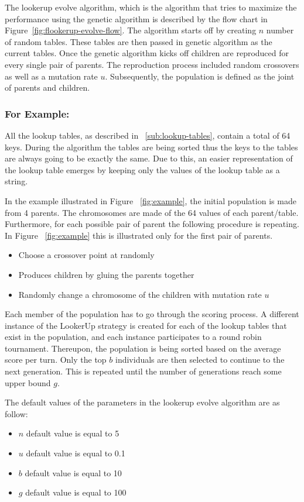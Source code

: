 The lookerup evolve algorithm, which is the algorithm that tries to maximize
the performance using the genetic algorithm is described by the flow chart in
Figure~\ref{fig:flookerup-evolve-flow}. The algorithm starts off by creating
\(n\) number of random tables. These tables are then passed in genetic algorithm
as the current tables.
Once the genetic algorithm kicks off children are reproduced for every single pair
of parents. The reproduction process included random crossovers as well as a
mutation rate \(u\). Subsequently, the population is defined as the joint of
parents and children.

\subsubsection{For Example:}

All the lookup tables, as described in ~\autoref{sub:lookup-tables}, contain
a total of 64 keys. During the algorithm the tables are being sorted thus
the keys to the tables are always going to be exactly the same. Due to this,
an easier representation of the lookup table emerges by keeping only the values
of the lookup table as a string.

In the example illustrated in Figure ~\ref{fig:example}, the initial population
is made from 4 parents. The chromosomes are made of the 64 values of each parent/table.
Furthermore, for each possible pair of parent the following procedure is repeating.
In Figure ~\ref{fig:example} this is illustrated only for the first pair of
parents.
\begin{itemize}
  \item Choose a crossover point at randomly
  \item Produces children by gluing the parents together
  \item Randomly change a chromosome of the children with mutation rate \(u\)
\end{itemize}

\newpage
Each member of the population has to go through the scoring process. A different
instance of the LookerUp strategy is created for each of the lookup tables that
exist in the population, and each instance participates to a round robin tournament.
Thereupon, the population is being sorted based on the average score per turn.
Only the top \(b\) individuals are then selected to continue to the next generation.
This is repeated until the number of generations reach some upper bound \(g\).

The default values of the parameters in the lookerup evolve algorithm are as
follow:
\begin{itemize}
  \item \(n\) default value is equal to 5
  \item \(u\) default value is equal to 0.1
  \item \(b\) default value is equal to 10
  \item \(g\) default value is equal to 100
\end{itemize}

